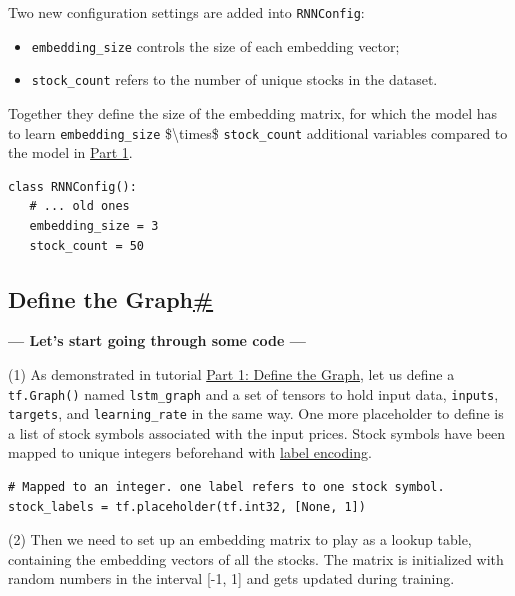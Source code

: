 Two new configuration settings are added into \texttt{RNNConfig}:

\begin{itemize}
\tightlist
\item
  \texttt{embedding\_size} controls the size of each embedding vector;
\item
  \texttt{stock\_count} refers to the number of unique stocks in the dataset.
\end{itemize}

Together they define the size of the embedding matrix, for which the model has to learn \texttt{embedding\_size} \$\textbackslash times\$ \texttt{stock\_count} additional variables compared to the model in \href{https://lilianweng.github.io/posts/2017-07-08-stock-rnn-part-1/}{Part 1}.

\begin{verbatim}
class RNNConfig():
   # ... old ones
   embedding_size = 3
   stock_count = 50
\end{verbatim}

\subsection{\texorpdfstring{Define the Graph\hyperref[define-the-graph]{\#}}{Define the Graph\#}}\label{define-the-graph}

\textbf{--- Let's start going through some code ---}

(1) As demonstrated in tutorial \href{https://lilianweng.github.io/posts/2017-07-08-stock-rnn-part-1/\#define-graph}{Part 1: Define the Graph}, let us define a \texttt{tf.Graph()} named \texttt{lstm\_graph} and a set of tensors to hold input data, \texttt{inputs}, \texttt{targets}, and \texttt{learning\_rate} in the same way. One more placeholder to define is a list of stock symbols associated with the input prices. Stock symbols have been mapped to unique integers beforehand with \href{http://scikit-learn.org/stable/modules/generated/sklearn.preprocessing.LabelEncoder.html}{label encoding}.

\begin{verbatim}
# Mapped to an integer. one label refers to one stock symbol.
stock_labels = tf.placeholder(tf.int32, [None, 1])
\end{verbatim}

(2) Then we need to set up an embedding matrix to play as a lookup table, containing the embedding vectors of all the stocks. The matrix is initialized with random numbers in the interval {[}-1, 1{]} and gets updated during training.

